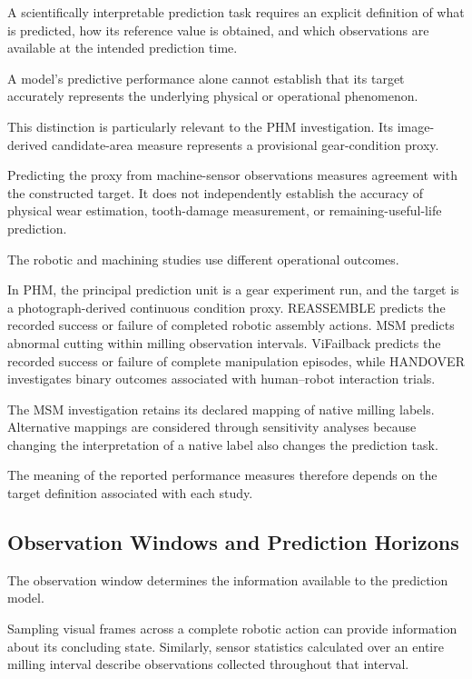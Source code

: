 A scientifically interpretable prediction task requires an explicit definition of what is predicted, how its reference value is obtained, and which observations are available at the intended prediction time.

A model’s predictive performance alone cannot establish that its target accurately represents the underlying physical or operational phenomenon.

This distinction is particularly relevant to the PHM investigation. Its image-derived candidate-area measure represents a provisional gear-condition proxy.

Predicting the proxy from machine-sensor observations measures agreement with the constructed target. It does not independently establish the accuracy of physical wear estimation, tooth-damage measurement, or remaining-useful-life prediction.

The robotic and machining studies use different operational outcomes.

In PHM, the principal prediction unit is a gear experiment run, and the target is a photograph-derived continuous condition proxy. REASSEMBLE predicts the recorded success or failure of completed robotic assembly actions. MSM predicts abnormal cutting within milling observation intervals. ViFailback predicts the recorded success or failure of complete manipulation episodes, while HANDOVER investigates binary outcomes associated with human–robot interaction trials.

The MSM investigation retains its declared mapping of native milling labels. Alternative mappings are considered through sensitivity analyses because changing the interpretation of a native label also changes the prediction task.

The meaning of the reported performance measures therefore depends on the target definition associated with each study.

\subsection{Observation Windows and Prediction Horizons}

The observation window determines the information available to the prediction model.

Sampling visual frames across a complete robotic action can provide information about its concluding state. Similarly, sensor statistics calculated over an entire milling interval describe observations collected throughout that interval.

